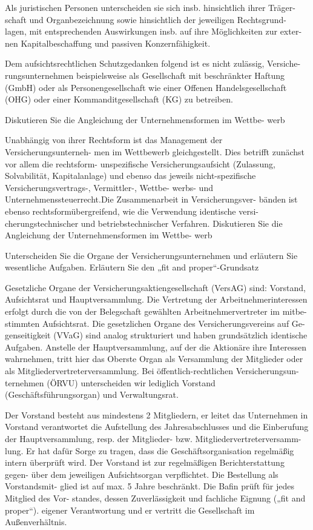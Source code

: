 Als juristischen Personen unterscheiden sie sich insb. hinsichtlich ihrer Träger-
schaft und Organbezeichnung sowie hinsichtlich der jeweiligen Rechtsgrund-
lagen, mit entsprechenden Auswirkungen insb. auf ihre Möglichkeiten zur exter-
nen Kapitalbeschaffung und passiven Konzernfähigkeit.

Dem aufsichtsrechtlichen Schutzgedanken folgend ist es nicht zulässig, Versiche-
rungsunternehmen beispielsweise als Gesellschaft mit beschränkter Haftung
(GmbH) oder als Personengesellschaft wie einer Offenen Handelsgesellschaft
(OHG) oder einer Kommanditgesellschaft (KG) zu betreiben.



Diskutieren Sie die Angleichung der Unternehmensformen im Wettbe-
werb

Unabhängig von ihrer Rechtsform ist das Management der Versicherungsunterneh-
men im Wettbewerb gleichgestellt. Dies betrifft zunächst vor allem die rechtsform-
unspezifische Versicherungsaufsicht (Zulassung, Solvabilität, Kapitalanlage) und
ebenso das jeweils nicht-spezifische Versicherungsvertrags-, Vermittler-, Wettbe-
werbs- und Unternehmenssteuerrecht.Die Zusammenarbeit in Versicherungsver-
bänden ist ebenso rechtsformübergreifend, wie die Verwendung identische versi-
cherungstechnischer und betriebstechnischer Verfahren.
Diskutieren Sie die Angleichung der Unternehmensformen im Wettbe-
werb


Unterscheiden Sie die Organe der Versicherungsunternehmen und erläutern Sie wesentliche Aufgaben.
Erläutern Sie den „fit and proper“-Grundsatz

Gesetzliche Organe der Versicherungsaktiengesellschaft (VersAG) sind: Vorstand,
Aufsichtsrat und Hauptversammlung. Die Vertretung der Arbeitnehmerinteressen
erfolgt durch die von der Belegschaft gewählten Arbeitnehmervertreter im mitbe-
stimmten Aufsichtsrat. Die gesetzlichen Organe des Versicherungsvereins auf Ge-
genseitigkeit (VVaG) sind analog strukturiert und haben grundsätzlich identische
Aufgaben. Anstelle der Hauptversammlung, auf der die Aktionäre ihre Interessen
wahrnehmen, tritt hier das Oberste Organ als Versammlung der Mitglieder oder
als Mitgliedervertreterversammlung. Bei öffentlich-rechtlichen Versicherungsun-
ternehmen (ÖRVU) unterscheiden wir lediglich Vorstand (Geschäftsführungsorgan)
und Verwaltungsrat.

Der Vorstand besteht aus mindestens 2 Mitgliedern, er leitet das Unternehmen in
Vorstand verantwortet die Aufstellung des Jahresabschlusses und die Einberufung
der Hauptversammlung, resp. der Mitglieder- bzw. Mitgliedervertreterversamm-
lung. Er hat dafür Sorge zu tragen, dass die Geschäftsorganisation regelmäßig
intern überprüft wird. Der Vorstand ist zur regelmäßigen Berichterstattung gegen-
über dem jeweiligen Aufsichtsorgan verpflichtet. Die Bestellung als Vorstandsmit-
glied ist auf max. 5 Jahre beschränkt. Die Bafin prüft für jedes Mitglied des Vor-
standes, dessen Zuverlässigkeit und fachliche Eignung („fit and proper“).
eigener Verantwortung und er vertritt die Gesellschaft im Außenverhältnis.


